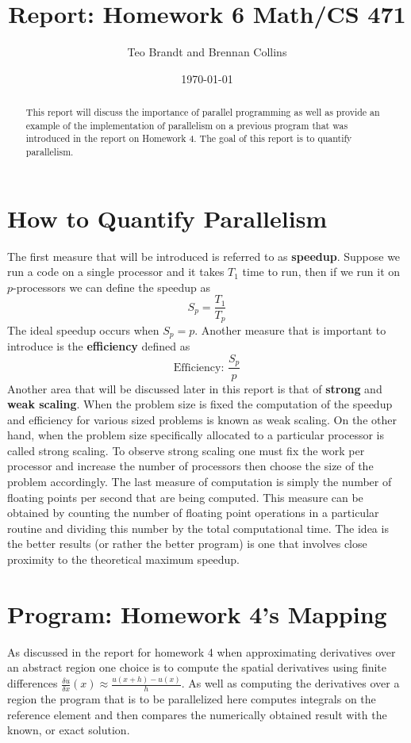 \documentclass[12pt]{article}
\title{Report: Homework 6 Math/CS 471}
\author{Teo Brandt and Brennan Collins}
\date{\today}   %
\theoremstyle{definition}
\theoremstyle{definition}
\begin{document}
\maketitle

\begin{abstract}
This report will discuss the importance of parallel programming as well as provide an example of the implementation of parallelism on a previous program that was introduced in the report on Homework 4. The goal of this report is to quantify parallelism.
\end{abstract}

\section{How to Quantify Parallelism}
The first measure that will be introduced is referred to as \textbf{speedup}. Suppose we run a code on a single processor and it takes \(T_{1}\) time to run, then if we run it on \(p\)-processors we can define the speedup as
\[
S_{p}=\frac{T_{1}}{T_{p}}
\]
The ideal speedup occurs when \(S_{p}={p}\). Another measure that is important to introduce is the \textbf{efficiency} defined as
\[
\text{Efficiency: }\frac{S_{p}}{p}
\]
Another area that will be discussed later in this report is that of \textbf{strong} and \textbf{weak scaling}. When the problem size is fixed the computation of the speedup and efficiency for various sized problems is known as weak scaling. On the other hand, when the problem size specifically allocated to a particular processor is called strong scaling. To observe strong scaling one must fix the work per processor and increase the number of processors then choose the size of the problem accordingly. The last measure of computation is simply the number of floating points per second that are being computed. This measure can be obtained by counting the number of floating point operations in a particular routine and dividing this number by the total computational time. The idea is the better results (or rather the better program) is one that involves close proximity to the theoretical maximum speedup.

\section{Program: Homework 4's Mapping}
As discussed in the report for homework 4 when approximating derivatives over an abstract region one choice is to compute the spatial derivatives using finite differences \(\frac{\delta u}{\delta x} (x) \approx \frac{u(x+h)-u(x)}{h}\). As well as computing the derivatives over a region the program that is to be parallelized here computes integrals on the reference element and then compares the numerically obtained result with the known, or exact solution.
\end{document}
